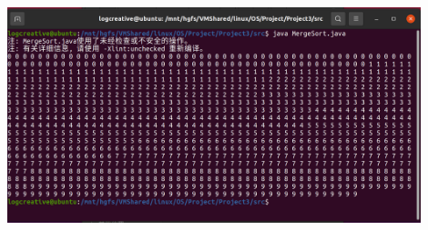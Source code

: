 \documentclass[12pt,a4paper]{article}
\newenvironment{problems}{\begin{list}{}{\renewcommand{\makelabel}[1]{\textbf{##1}\hfil}}}{\end{list}}
\providecommand{\code}[2]{}
\begin{document}
\begin{problems}
    \code{src/QuickSort.java}{java}

    \includegraphics[width=0.9\textwidth]{mergesort.png}

    \code{src/MergeSort.java}{java}

\end{problems}
\end{document}

